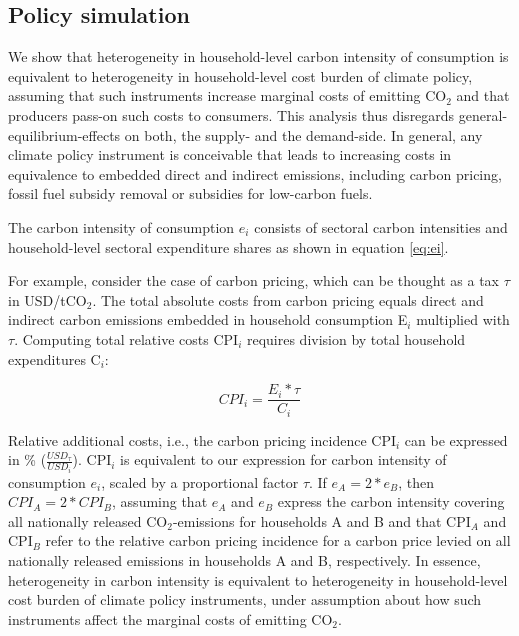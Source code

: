 \documentclass[12pt, a4paper]{article}
\begin{document}
\subsection{Policy simulation}\label{sec:policysimulation}

We show that heterogeneity in household-level carbon intensity of consumption is equivalent to heterogeneity in household-level cost burden of climate policy, assuming that such instruments increase marginal costs of emitting CO$_{2}$ and that producers pass-on such costs to consumers. This analysis thus disregards general-equilibrium-effects on both, the supply- and the demand-side. In general, any climate policy instrument is conceivable that leads to increasing costs in equivalence to embedded direct and indirect emissions, including carbon pricing, fossil fuel subsidy removal or subsidies for low-carbon fuels.

The carbon intensity of consumption $e_{i}$ consists of sectoral carbon intensities and household-level sectoral expenditure shares as shown in equation \ref{eq:ei}. 

For example, consider the case of carbon pricing, which can be thought as a tax $\tau$ in USD/tCO$_{2}$. The total absolute costs from carbon pricing equals direct and indirect carbon emissions embedded in household consumption E$_{i}$ multiplied with $\tau$. Computing total relative costs CPI$_{i}$ requires division by total household expenditures C$_{i}$:

\begin{equation}
    CPI_{i} = \frac{E_{i}*\tau}{C_{i}}
\end{equation}

Relative additional costs, i.e., the carbon pricing incidence CPI$_{i}$ can be expressed in \% ($\frac{USD_{\tau}}{USD_{i}}$). CPI$_{i}$ is equivalent to our expression for carbon intensity of consumption $e_{i}$, scaled by a proportional factor $\tau$. If $e_{A}=2*e_{B}$, then $CPI_{A}=2*CPI_{B}$, assuming that $e_{A}$ and $e_{B}$ express the carbon intensity covering all nationally released CO$_{2}$-emissions for households A and B and that CPI$_{A}$ and CPI$_{B}$ refer to the relative carbon pricing incidence for a carbon price levied on all nationally released emissions in households A and B, respectively. In essence, heterogeneity in carbon intensity is equivalent to heterogeneity in household-level cost burden of climate policy instruments, under assumption about how such instruments affect the marginal costs of emitting CO$_{2}$.
\end{document}
